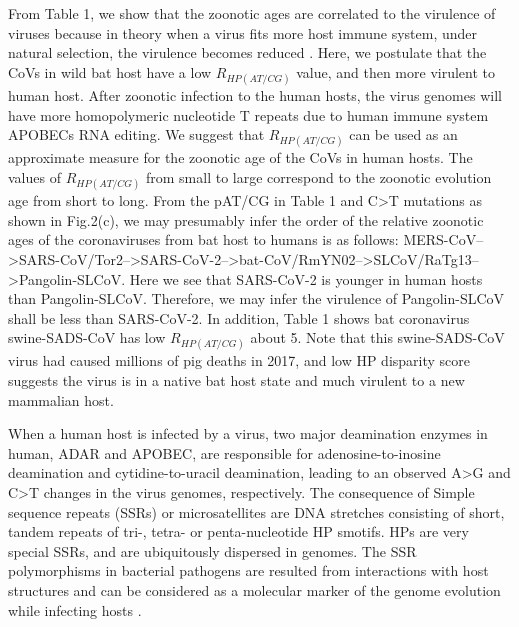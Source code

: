 \documentclass{article}
\numberwithin{equation}{section}
\begin{document}
From Table 1, we show that the zoonotic ages are correlated to the virulence of viruses because in theory when a virus fits more host immune system, under natural selection, the virulence becomes reduced \citep{alizon2009virulence}. Here, we postulate that the CoVs in wild bat host have a low $R_{HP(AT/CG)}$ value, and then more virulent to human host. After zoonotic infection to the human hosts, the virus genomes will have more homopolymeric nucleotide T repeats due to human immune system APOBECs RNA editing. We suggest that $R_{HP(AT/CG)}$ can be used as an approximate measure for the zoonotic age of the CoVs in human hosts. The values of $R_{HP(AT/CG)}$ from small to large correspond to the zoonotic evolution age from short to long. From the pAT/CG in Table 1 and C>T mutations as shown in Fig.2(c), we may presumably infer the order of the relative zoonotic ages of the coronaviruses from bat host to humans is as follows: MERS-CoV-->SARS-CoV/Tor2-->SARS-CoV-2-->bat-CoV/RmYN02-->SLCoV/RaTg13-->Pangolin-SLCoV. Here we see that SARS-CoV-2 is younger in human hosts than Pangolin-SLCoV. Therefore, we may infer the virulence of Pangolin-SLCoV shall be less than SARS-CoV-2. In addition, Table 1 shows bat coronavirus swine-SADS-CoV has low $R_{HP(AT/CG)}$ about 5. Note that this swine-SADS-CoV virus had caused millions of pig deaths in 2017, and low HP disparity score suggests the virus is in a native bat host state and much virulent to a new mammalian host.

When a human host is infected by a virus, two major deamination enzymes in human, ADAR and APOBEC, are responsible for adenosine-to-inosine deamination and cytidine-to-uracil deamination, leading to an observed A>G and C>T changes in the virus genomes, respectively. The consequence of Simple sequence repeats (SSRs) or microsatellites are DNA stretches consisting of short, tandem repeats of tri-, tetra- or penta-nucleotide HP smotifs. HPs are very special SSRs, and are ubiquitously dispersed in genomes. The SSR polymorphisms in bacterial pathogens are resulted from interactions with host structures and can be considered as a molecular marker of the genome evolution while infecting hosts \citep{moxon2006bacterial}.
\end{document}
